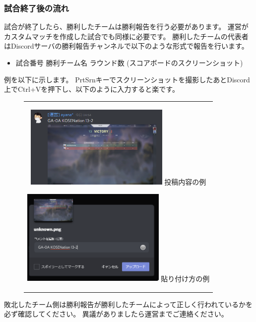 \documentclass[uplatex,dvipdfmx]{jsarticle}
\begin{document}
	    \subsubsection{試合終了後の流れ}
            試合が終了したら、勝利したチームは勝利報告を行う必要があります。
            運営がカスタムマッチを作成した試合でも同様に必要です。
	        勝利したチームの代表者はDiscordサーバの勝利報告チャンネルで以下のような形式で報告を行います。
	        \begin{itemize}
	            \item 試合番号 勝利チーム名 ラウンド数 (スコアボードのスクリーンショット)
	        \end{itemize}
	        例を以下に示します。
	        PrtSrnキーでスクリーンショットを撮影したあとDiscord上でCtrl+Vを押下し、以下のように入力すると楽です。
	        \begin{figure}[H]
	            \begin{center}
	                \begin{tabular}{c}
	                    \begin{minipage}{0.5\hsize}
	                        \begin{center}
	                            \includegraphics[width=70mm]{result.png}
	                            \hspace{1.6cm} 投稿内容の例
	                        \end{center}
	                    \end{minipage}

	                    \begin{minipage}{0.5\hsize}
	                        \begin{center}
	                            \includegraphics[width=70mm]{example.png}
	                            \hspace{1.6cm} 貼り付け方の例
	                        \end{center}
	                    \end{minipage}
	                \end{tabular}
	            \end{center}
	        \end{figure}
	        敗北したチーム側は勝利報告が勝利したチームによって正しく行われているかを必ず確認してください。
	        異議がありましたら運営までご連絡ください。
\end{document}
